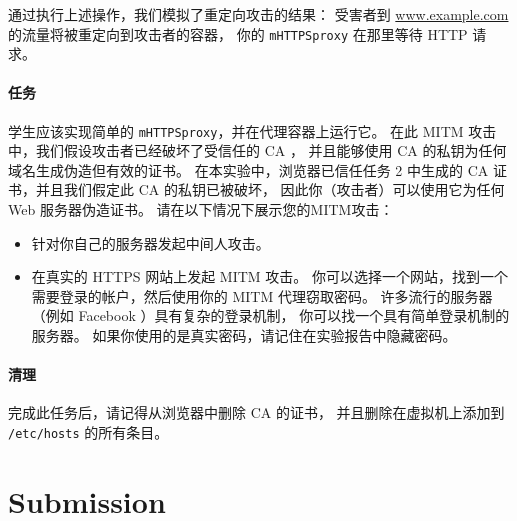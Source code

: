 通过执行上述操作，我们模拟了重定向攻击的结果：
受害者到 \url{www.example.com} 的流量将被重定向到攻击者的容器，
你的 \texttt{mHTTPSproxy} 在那里等待 HTTP 请求。


\paragraph{任务}
学生应该实现简单的 \texttt{mHTTPSproxy}，并在代理容器上运行它。
在此 MITM 攻击中，我们假设攻击者已经破坏了受信任的 CA ，
并且能够使用 CA 的私钥为任何域名生成伪造但有效的证书。
在本实验中，浏览器已信任任务 2 中生成的 CA 证书，并且我们假定此 CA 的私钥已被破坏，
因此你（攻击者）可以使用它为任何 Web 服务器伪造证书。
请在以下情况下展示您的MITM攻击：


\begin{itemize}
    \item 针对你自己的服务器发起中间人攻击。

    \item 在真实的 HTTPS 网站上发起 MITM 攻击。
          你可以选择一个网站，找到一个需要登录的帐户，然后使用你的 MITM 代理窃取密码。
          许多流行的服务器（例如 Facebook ）具有复杂的登录机制，
          你可以找一个具有简单登录机制的服务器。
          如果你使用的是真实密码，请记住在实验报告中隐藏密码。
\end{itemize}



\paragraph{清理} 完成此任务后，请记得从浏览器中删除 CA 的证书，
并且删除在虚拟机上添加到 \texttt{/etc/hosts} 的所有条目。



\section{Submission}











